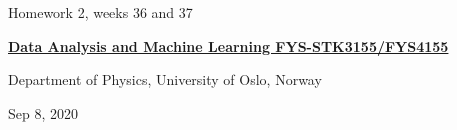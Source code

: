 \documentclass[%
oneside,                 %
final,                   %
10pt]{article}
\begin{document}

\newcommand{\exercisesection}[1]{\subsection*{#1}}






\thispagestyle{empty}

\begin{center}
{\LARGE\bf
\begin{spacing}{1.25}
Homework 2, weeks 36 and 37
\end{spacing}
}
\end{center}


\begin{center}
{\bf \href{{http://www.uio.no/studier/emner/matnat/fys/FYS3155/index-eng.html}}{Data Analysis and Machine Learning FYS-STK3155/FYS4155}}
\end{center}

    \begin{center}
\centerline{{\small Department of Physics, University of Oslo, Norway}}
\end{center}
    

\begin{center}
Sep 8, 2020
\end{center}

\vspace{1cm}
\end{document}
